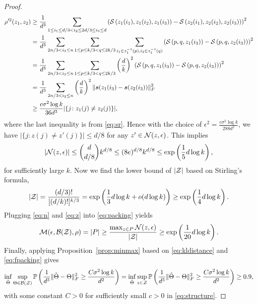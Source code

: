 \documentclass[12pt]{article}
\theoremstyle{definition}
\begin{document}
\begin{proof}
\begin{align}
    \rho'^2(z_1,z_2) &\geq \frac{1}{d^3}\sum_{1\leq i_1\leq d/3<i_2\leq 2d/3\leq i_3\leq d}\left( \mathcal{S}\left(z_1(i_1),z_1(i_2),z_1(i_3)\right)-\mathcal{S}\left(z_2(i_1),z_2(i_2),z_2(i_3)\right)\right)^2\\
    &= \frac{1}{d^3}\sum_{2n/3<i_3\leq n}\sum_{1\leq p \leq k/3< q\leq 2k/3}\sum_{i_1\in z_1^{-1}(p),i_2\in z_1^{-1}(q)}\left( \mathcal{S}\left(p,q,z_1(i_3)\right)-\mathcal{S}\left(p,q,z_2(i_3)\right)\right)^2\\&=
    \frac{1}{d^3}\sum_{2n/3<i_3\leq n}\sum_{1\leq p \leq k/3< q\leq 2k/3}\left(d\over k\right)^2\left( \mathcal{S}\left(p,q,z_1(i_3)\right)-\mathcal{S}\left(p,q,z_2(i_3)\right)\right)^2\\&=
    \frac{1}{d^3}\sum_{2n/3<i_3\leq n}\left(d\over k\right)^2\lVert\bm{s}(z_1(i_3)-\bm{s}(z_2(i_3))\rVert_F^2
    \\&\geq  \frac{c\sigma^2\log k}{36d^3}|\{j\colon z_1(j)\neq z_2(j)\}|,
\end{align}where the last inequality is from \eqref{eq:sr}. Hence with the choice of $\epsilon^2 = \frac{c\sigma^2\log k}{288d^2}$, we have $|\{j\colon z(j)\neq z'(j)\}|\leq d/8$ for any $z'\in\mathcal{N}(z,\epsilon)$.
This implies
\begin{align}\label{eq:n}
    |\mathcal{N}(z,\epsilon)|\leq {d\choose d/8}k^{d/8}\leq (8e)^{d/8}k^{d/8}\leq \exp\left(\frac{1}{5}d\log k\right),
\end{align}
for sufficiently large $k$.
Now we find the lower bound of $|\mathcal{Z}|$ based on Stirling's formula,
\begin{align}\label{eq:z}
    |\mathcal{Z}| = \frac{(d/3)!}{[(d/k)!]^{k/3}} = \exp\left(\frac{1}{3}d\log k + o(d\log k)\right)\geq\exp\left(\frac{1}{4}d\log k\right).
\end{align}
Plugging \eqref{eq:n} and \eqref{eq:z} into \eqref{eq:packing} yields
\begin{align}\label{eq:fpacking}
    \mathcal{M}(\epsilon,\mathcal{B}(\mathcal{Z}),\rho) = |P| \geq\frac{\max_{z\in P}\mathcal{N}(z,\epsilon)}{|\mathcal{Z}|}\geq\exp\left(\frac{1}{20}d\log k\right).
\end{align}
Finally, applying Proposition~\ref{prop:minmax} based on  \eqref{eq:kldistance} and \eqref{eq:fpacking} gives
\begin{align}
    \inf_{\hat\Theta}\sup_{\Theta\in\mathcal{B}(\mathcal{Z})}\mathbb{P}\left(\frac{1}{d^3}\lVert\hat\Theta-\Theta\rVert_F^2\geq \frac{C\sigma^2\log k}{d^2}\right)=\inf_{\hat\Theta}\sup_{z\in\mathcal{Z}}\mathbb{P}\left(\frac{1}{d^3}\lVert\hat\Theta-\Theta\rVert_F^2\geq \frac{C\sigma^2\log k}{d^2}\right)\geq 0.9,
\end{align}
with some constant $C>0$ for sufficiently small $c>0$ in \eqref{eq:structure}.
\end{proof}
\end{document}
